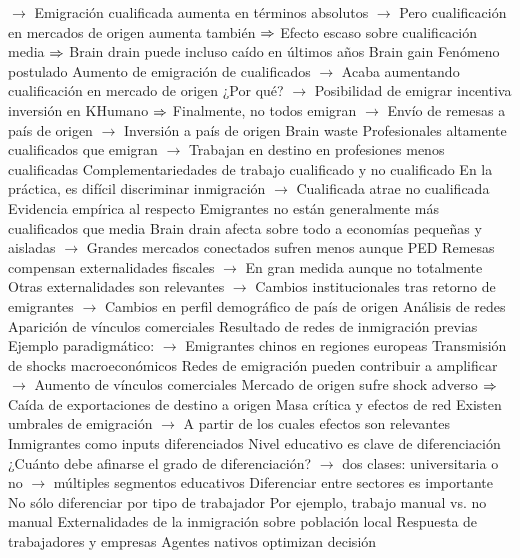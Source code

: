\documentclass{nuevotema}
\begin{document}
\begin{esquemal}
				\4[] $\to$ Emigración cualificada aumenta en términos absolutos
				\4[] $\to$ Pero cualificación en mercados de origen aumenta también
				\4[] $\Rightarrow$ Efecto escaso sobre cualificación media
				\4[] $\Rightarrow$ Brain drain puede incluso caído en últimos años
				\4 Brain gain
				\4[] Fenómeno postulado
				\4[] Aumento de emigración de cualificados
				\4[] $\to$ Acaba aumentando cualificación en mercado de origen
				\4[] ¿Por qué?
				\4[] $\to$ Posibilidad de emigrar incentiva inversión en KHumano
				\4[] $\Rightarrow$ Finalmente, no todos emigran
				\4[] $\to$ Envío de remesas a país de origen
				\4[] $\to$ Inversión a país de origen
				\4 Brain waste
				\4[] Profesionales altamente cualificados que emigran
				\4[] $\to$ Trabajan en destino en profesiones menos cualificadas
				\4 Complementariedades de trabajo cualificado y no cualificado
				\4[] En la práctica, es difícil discriminar inmigración
				\4[] $\to$ Cualificada atrae no cualificada
				\4 Evidencia empírica al respecto
				\4[] Emigrantes no están generalmente más cualificados que media
				\4[] Brain drain afecta sobre todo a economías pequeñas y aisladas
				\4[] $\to$ Grandes mercados conectados sufren menos aunque PED
				\4[] Remesas compensan externalidades fiscales
				\4[] $\to$ En gran medida aunque no totalmente
				\4[] Otras externalidades son relevantes
				\4[] $\to$ Cambios institucionales tras retorno de emigrantes
				\4[] $\to$ Cambios en perfil demográfico de país de origen
			\3 Análisis de redes
				\4 Aparición de vínculos comerciales
				\4[] Resultado de redes de inmigración previas
				\4[] Ejemplo paradigmático:
				\4[] $\to$ Emigrantes chinos en regiones europeas
				\4 Transmisión de shocks macroeconómicos
				\4[] Redes de emigración pueden contribuir a amplificar
				\4[] $\to$ Aumento de vínculos comerciales
				\4[] Mercado de origen sufre shock adverso
				\4[] $\Rightarrow$ Caída de exportaciones de destino a origen
				\4 Masa crítica y efectos de red
				\4[] Existen umbrales de emigración
				\4[] $\to$ A partir de los cuales efectos son relevantes
			\3 Inmigrantes como inputs diferenciados
				\4 Nivel educativo es clave de diferenciación
				\4[] ¿Cuánto debe afinarse el grado de diferenciación?
				\4[] $\to$ dos clases: universitaria o no
				\4[] $\to$ múltiples segmentos educativos
				\4 Diferenciar entre sectores es importante
				\4[] No sólo diferenciar por tipo de trabajador
				\4[] Por ejemplo, trabajo manual vs. no manual
			\3 Externalidades de la inmigración sobre población local
				\4 Respuesta de trabajadores y empresas
				\4[] Agentes nativos optimizan decisión

\end{esquemal}
\end{document}
